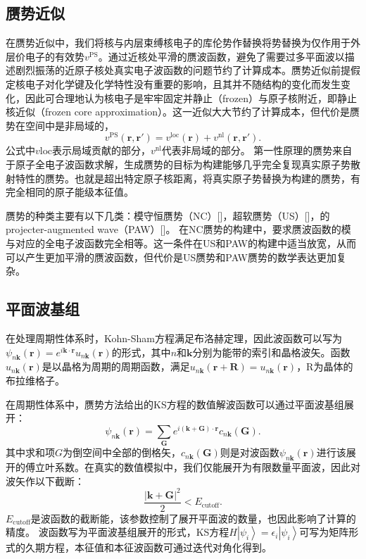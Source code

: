 \documentclass[phd,nobackinfo]{scutthesis}
\begin{document}
\subsection{赝势近似}
在赝势近似中，我们将核与内层束缚核电子的库伦势作替换将势替换为仅作用于外层价电子的有效势$v^\mathrm{PS}$。通过近核处平滑的赝波函数，避免了需要过多平面波以描述剧烈振荡的近原子核处真实电子波函数的问题节约了计算成本。赝势近似前提假定核电子对化学键及化学特性没有重要的影响，且其并不随结构的变化而发生变化，因此可合理地认为核电子是牢牢固定并静止（frozen）与原子核附近，即静止核近似（frozen core approximation）。这一近似大大节约了计算成本，但代价是赝势在空间中是非局域的，
\begin{equation}
  v^{\mathrm{PS}}(\bm{r},\bm{r'}) = v^{\mathrm{loc}}(\bm{r}) + v^{\mathrm{nl}}(\bm{r},\bm{r'}).
\end{equation}
公式中$v\mathrm{loc}$表示局域贡献的部分，$v^\mathrm{nl}$代表非局域的部分。
第一性原理的赝势来自于原子全电子波函数求解，生成赝势的目标为构建能够几乎完全复现真实原子势散射特性的赝势。也就是超出特定原子核距离，将真实原子势替换为构建的赝势，有完全相同的原子能级本征值。

赝势的种类主要有以下几类：模守恒赝势（NC）[]，超软赝势（US）[]，的projecter-augmented wave（PAW）[]。 在NC赝势的构建中，要求赝波函数的模与对应的全电子波函数完全相等。这一条件在US和PAW的构建中适当放宽，从而可以产生更加平滑的赝波函数，但代价是US赝势和PAW赝势的数学表达更加复杂。

\subsection{平面波基组}
在处理周期性体系时，Kohn-Sham方程满足布洛赫定理，因此波函数可以写为$\psi_{n\bm{k}}(\bm{r})=e^{i\bm{k}\cdot \bm{r}} u_{n\bm{k}}(\bm{r})$的形式，其中$n$和$\bm{k}$分别为能带的索引和晶格波矢。函数$u_{n\bm{k}}(\bm{r})$是以晶格为周期的周期函数，满足$u_{n\bm{k}}(\bm{r}+\bm{R})=u_{n\bm{k}}(\bm{r})$，R为晶体的布拉维格子。

在周期性体系中，赝势方法给出的KS方程的数值解波函数可以通过平面波基组展开：
\begin{equation}
  \psi_{n\bm{k}}(\bm{r}) = \sum_{\bm{G}}e^{i(\bm{k}+\bm{G})\cdot \bm{r}}c_{n\bm{k}}(\bm{G}).
\end{equation}
其中求和项$G$为倒空间中全部的倒格矢，$c_{n\bm{k}}(\bm{G})$则是对波函数$\psi_{n\bm{k}}(\bm{r})$进行该展开的傅立叶系数。在真实的数值模拟中，我们仅能展开为有限数量平面波，因此对波矢作以下截断：
\begin{equation}
  \frac{|\bm{k} + \bm{G}|^2}{2} < E_{\mathrm{cutoff}}.
\end{equation}
$E_{\mathrm{cutoff}}$是波函数的截断能，该参数控制了展开平面波的数量，也因此影响了计算的精度。
波函数写为平面波基组展开的形式，KS方程$H\left|\psi_i\right>=\epsilon_i\left|\psi_i\right>$可写为矩阵形式的久期方程，本征值和本征波函数可通过迭代对角化得到。
\end{document}
